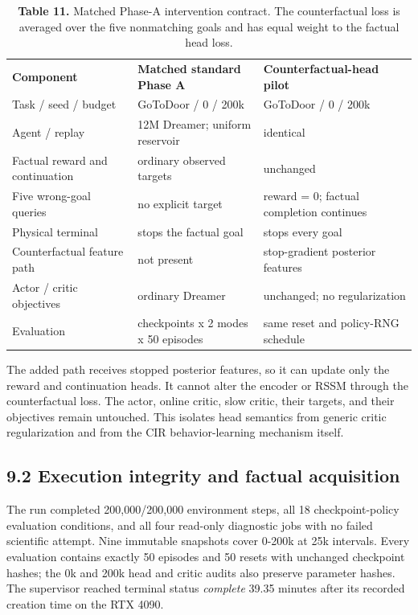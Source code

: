 \documentclass[10pt,a4paper]{article}
\newcommand{\reportsubsection}[1]{\subsection{\textcolor{brandblue}{#1}}}
\begin{document}
\begin{table}[H]
\centering
\begingroup
\footnotesize
\setlength{\tabcolsep}{3.5pt}
\renewcommand{\arraystretch}{1.15}
\begin{tabularx}{\textwidth}{@{} >{\hsize=0.725\hsize\RaggedRight\arraybackslash}X >{\hsize=1.099\hsize\RaggedRight\arraybackslash}X >{\hsize=1.175\hsize\RaggedRight\arraybackslash}X @{}}
\rowcolor{brandblue}
\color{white}\textbf{Component} & \color{white}\textbf{Matched standard Phase A} & \color{white}\textbf{Counterfactual-head pilot} \\
Task / seed / budget & GoToDoor / 0 / 200k & GoToDoor / 0 / 200k \\
\rowcolor{rowgray}
Agent / replay & 12M Dreamer; uniform reservoir & identical \\
Factual reward and continuation & ordinary observed targets & unchanged \\
\rowcolor{rowgray}
Five wrong-goal queries & no explicit target & reward = 0; factual completion continues \\
Physical terminal & stops the factual goal & stops every goal \\
\rowcolor{rowgray}
Counterfactual feature path & not present & stop-gradient posterior features \\
Actor / critic objectives & ordinary Dreamer & unchanged; no regularization \\
\rowcolor{rowgray}
Evaluation & 9 checkpoints x 2 modes x 50 episodes & same reset and policy-RNG schedule \\
\bottomrule
\end{tabularx}
\endgroup
\caption*{\textbf{Table 11.} Matched Phase-A intervention contract. The counterfactual loss is averaged over the five nonmatching goals and has equal weight to the factual head loss.}
\end{table}
The added path receives stopped posterior features, so it can update only the reward and continuation heads. It cannot alter the encoder or RSSM through the counterfactual loss. The actor, online critic, slow critic, their targets, and their objectives remain untouched. This isolates head semantics from generic critic regularization and from the CIR behavior-learning mechanism itself.

\reportsubsection{9.2 Execution integrity and factual acquisition}
The run completed 200,000/200,000 environment steps, all 18 checkpoint-policy evaluation conditions, and all four read-only diagnostic jobs with no failed scientific attempt. Nine immutable snapshots cover 0-200k at 25k intervals. Every evaluation contains exactly 50 episodes and 50 resets with unchanged checkpoint hashes; the 0k and 200k head and critic audits also preserve parameter hashes. The supervisor reached terminal status \emph{complete} 39.35 minutes after its recorded creation time on the RTX 4090.
\end{document}
